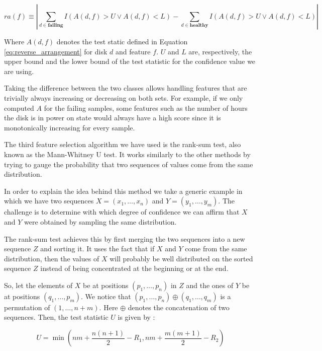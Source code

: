\begin{equation}
  ra(f) \equiv \left| \sum_{d \in \mathbf{failing}} I(A(d, f) > U \lor A(d, f) < L) - \sum_{d \in \mathbf{healthy}} I(A(d, f) > U \lor A(d, f) < L) \right|
\end{equation}

Where $A(d, f)$ denotes the test static defined in Equation \ref{eq:reverse_arrangement} for disk $d$ and feature $f$.
$U$ and $L$ are, respectively, the upper bound and the lower bound of the test statistic for the confidence value we are using.

Taking the difference between the two classes allows handling features that are trivially always increasing or decreasing on both sets.
For example, if we only computed $A$ for the failing samples, some features such as the number of hours the disk is in power on state would always have a high score since it is monotonically increasing for every sample.

The third feature selection algorithm we have used is the rank-sum test, also known as the Mann-Whitney U test.
It works similarly to the other methods by trying to gauge the probability that two sequences of values come from the same distribution.

In order to explain the idea behind this method we take a generic example in which we have two sequences $X = (x_1,\dots,x_n)$ and $Y = (y_1,\dots,y_m)$.
The challenge is to determine with which degree of confidence we can affirm that $X$ and $Y$ were obtained by sampling the same distribution.

The rank-sum test achieves this by first merging the two sequences into a new sequence $Z$ and sorting it.
It uses the fact that if $X$ and $Y$ come from the same distribution, then the values of $X$ will probably be well distributed on the sorted sequence $Z$ instead of being concentrated at the beginning or at the end.

So, let the elements of $X$ be at positions $(p_1, \dots, p_n)$ in $Z$ and the ones of $Y$ be at positions $(q_1, \dots, p_m)$.
We notice that $(p_1, \dots, p_n) \oplus (q_1, \dots, q_m)$ is a permutation of $(1,\dots,n+m)$.
Here $\oplus$ denotes the concatenation of two sequences.
Then, the test statistic $U$ is given by \cite{macfarland2016mann}:

\begin{equation}
  U = \min\left(nm + \dfrac{n(n+1)}{2} - R_1, nm + \dfrac{m(m+1)}{2} - R_2\right)
\end{equation}

